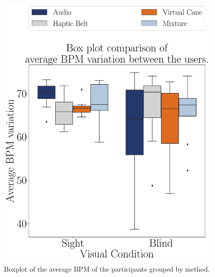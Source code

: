 \begin{figure}[!htb]
    \centering
    \begin{minipage}{0.45\textwidth}
        \centering
        \includegraphics[width = \textwidth]{Resultados/ECG/Figuras/pdf/boxplot_ecg_bpm_4_scene.pdf}
        \caption{Boxplot of the average BPM of the participants grouped by method.}
        \label{fig:boxplot_ecg_bpm_4_scene}
    \end{minipage}
    \begin{minipage}{0.075\textwidth}
        \hfill
    \end{minipage}
    \begin{minipage}{0.45\textwidth}
        \centering

\end{minipage}
\end{figure}
